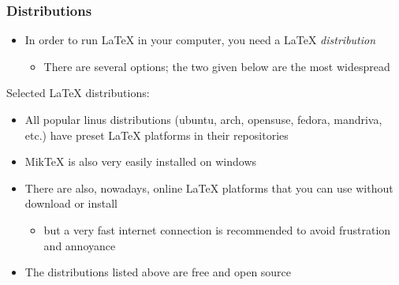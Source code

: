 \documentclass{beamer}
\begin{document}
\begin{frame}
 \frametitle{Distributions}
  


\begin{itemize}
  \item In order to run \LaTeX{} in your computer, you need a \LaTeX{} \emph{distribution}
\begin{itemize}
  \item There are several options; the two given below are the most widespread
\end{itemize}
\end{itemize}

\begin{block}{Selected \LaTeX{} distributions:}
\end{block}

\begin{itemize}
  \item All popular linus distributions (ubuntu, arch, opensuse, fedora, mandriva, etc.) have preset \LaTeX{} platforms in their repositories
  \item Mik\TeX{} is also very easily installed on windows
\end{itemize}

\begin{itemize}
  \item There are also, nowadays, online \LaTeX{} platforms that you can use without download or install
\begin{itemize}
  \item but a very fast internet connection is recommended to avoid frustration and annoyance
\end{itemize}
\end{itemize}

\begin{itemize}
  \item The distributions listed above are free and open source
\end{itemize}

  
\end{frame}
\end{document}
